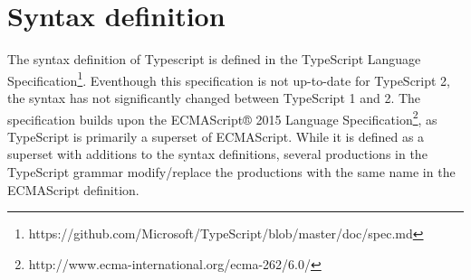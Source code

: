 \section{Syntax definition}
The syntax definition of Typescript is defined in the TypeScript Language Specification\footnote{https://github.com/Microsoft/TypeScript/blob/master/doc/spec.md}.
Eventhough this specification is not up-to-date for TypeScript 2, the syntax has not significantly changed between TypeScript 1 and 2.
The specification builds upon the ECMAScript® 2015 Language Specification\footnote{http://www.ecma-international.org/ecma-262/6.0/}, as TypeScript is primarily a superset of ECMAScript.
While it is defined as a superset with additions to the syntax definitions, several productions in the TypeScript grammar modify/replace the productions with the same name in the ECMAScript definition.

